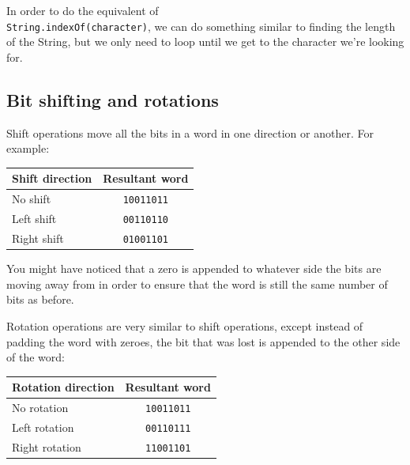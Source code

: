 In order to do the equivalent of\\{\tt String.indexOf(character)}, we can do
something similar to finding the length of the String, but we only need to loop
until we get to the character we're looking for.



\subsection{Bit shifting and rotations}
\label{subsec:bitshifting}

Shift operations move all the bits in a word in one direction or another. For
example:

\begin{center}
	\begin{tabular}{|l|c|}
		\hline
		{\bf Shift direction} & {\bf Resultant word}\\ \hline
		No shift & {\tt 10011011}\\ \hline
		Left shift & {\tt 00110110}\\ \hline
		Right shift & {\tt 01001101}\\ \hline
	\end{tabular}
\end{center}


You might have noticed that a zero is appended to whatever side the bits are
moving away from in order to ensure that the word is still the same number of
bits as before.


Rotation operations are very similar to shift operations, except instead of
padding the word with zeroes, the bit that was lost is appended to the other
side of the word:

\begin{center}
	\begin{tabular}{|l|c|}
		\hline
		{\bf Rotation direction} & {\bf Resultant word}\\ \hline
		No rotation & {\tt 10011011}\\ \hline
		Left rotation & {\tt 00110111}\\ \hline
		Right rotation & {\tt 11001101}\\ \hline
	\end{tabular}
\end{center}

